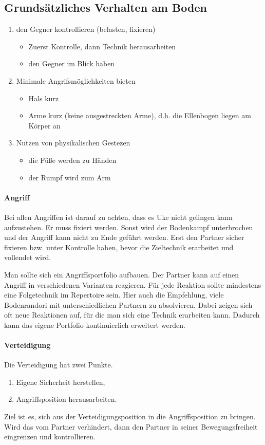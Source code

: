 \documentclass[justified, a4paper, notitlepage, captions=tableheading, nobib]{tufte-handout}
\begin{document}
\subsection{Grundsätzliches Verhalten am Boden}
\label{sec:org15c65a6}
\begin{enumerate}
\item den Gegner kontrollieren (belasten, fixieren) 
\begin{itemize}
\item Zuerst Kontrolle, dann Technik herausarbeiten
\item den Gegner im Blick haben
\end{itemize}
\item Minimale Angrifsmöglichkeiten bieten
\begin{itemize}
\item Hals kurz
\item Arme kurz (keine ausgestreckten Arme), d.h. die Ellenbogen liegen am Körper an
\end{itemize}
\item Nutzen von physikalischen Gestezen
\begin{itemize}
\item die Füße werden zu Händen
\item der Rumpf wird zum Arm
\end{itemize}
\end{enumerate}

\paragraph{Angriff}
\label{sec:orgc0721e3}
Bei allen Angriffen ist darauf zu achten, dass es Uke nicht gelingen kann aufzustehen. 
Er muss fixiert werden. Sonst wird der Bodenkampf unterbrochen und der Angriff kann nicht zu Ende geführt werden.
Erst den Partner sicher fixieren bzw. unter Kontrolle haben, bevor die Zieltechnik erarbeitet und vollendet wird.

Man sollte sich ein Angriffsportfolio aufbauen. Der Partner kann auf einen Angriff in verschiedenen Varianten reagieren. Für jede Reaktion sollte mindestens eine Folgetechnik im Repertoire sein. Hier auch die Empfehlung, viele Bodenrandori mit unterschiedlichen Partnern zu absolvieren. Dabei zeigen sich oft neue Reaktionen auf, für die man sich eine Technik erarbeiten kann. Dadurch kann das eigene Portfolio kontinuierlich erweitert werden. 

\paragraph{Verteidigung}
\label{sec:org52ef721}
Die Verteidigung hat zwei Punkte. 
\begin{enumerate}
\item Eigene Sicherheit herstellen,
\item Angriffsposition herausarbeiten.
\end{enumerate}
Ziel ist es, sich aus der Verteidigungsposition in die Angriffsposition zu bringen. 
Wird das vom Partner verhindert, dann den Partner in seiner Bewegungsfreiheit eingrenzen und kontrollieren.
\end{document}
